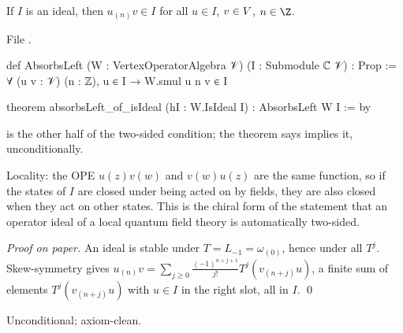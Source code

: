 \begin{theorem}\label{l04:thm:twosided}
If $I$ is an ideal, then $u_{(n)}v\in I$ for all $u\in I$, $v\in V$, $n\in\Z$.
\end{theorem}
\noindent File .
\begin{leancode}
def AbsorbsLeft (W : VertexOperatorAlgebra 𝒱) (I : Submodule ℂ 𝒱) : Prop :=
  ∀ (u v : 𝒱) (n : ℤ), u ∈ I → W.smul u n v ∈ I

theorem absorbsLeft_of_isIdeal (hI : W.IsIdeal I) : AbsorbsLeft W I := by
\end{leancode}
\begin{dictionary}
 is the other half of the two-sided condition; the theorem says
 implies it, unconditionally.
\end{dictionary}
\begin{physics}
Locality: the OPE $u(z)v(w)$ and $v(w)u(z)$ are the same function, so if the states of $I$ are
closed under being acted on by fields, they are also closed when they act on other states. This is
the chiral form of the statement that an operator ideal of a local quantum field theory is
automatically two-sided.
\end{physics}
\emph{Proof on paper.} An ideal is stable under $T = L_{-1} = \omega_{(0)}$, hence under all
$T^j$. Skew-symmetry gives $u_{(n)}v = \sum_{j\ge0}\frac{(-1)^{n+j+1}}{j!}T^j(v_{(n+j)}u)$, a
finite sum of elements $T^j(v_{(n+j)}u)$ with $u\in I$ in the right slot, all in $I$. \qed
\begin{status}
Unconditional; axiom-clean.
\end{status}

